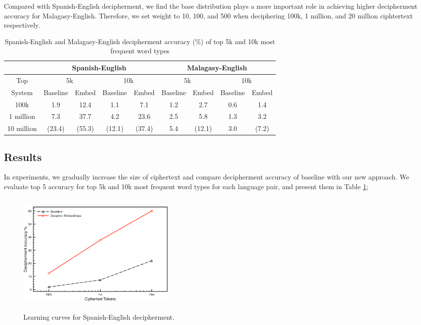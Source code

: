 Compared with Spanish-English decipherment, we find the base distribution plays a more important role in achieving higher decipherment accuracy for Malagasy-English. Therefore, we set weight to 10, 100, and 500 when deciphering 100k, 1 million, and 20 million ciphtertext respectively.


%
 \begin{table}[!ht]
 \begin{center}
 \begin{tabular}{ |c|c|c|c|c|c|c|c|c| } \hline
         & \multicolumn{4}{|c|}{Spanish-English} & \multicolumn{4}{|c|}{Malagasy-English} \\ \hline
 Top &  \multicolumn{2}{|c|}{5k} & \multicolumn{2}{|c|}{10k} & \multicolumn{2}{|c|}{5k} & \multicolumn{2}{|c|}{10k} \\ \hline
 System &  Baseline & Embed & Baseline & Embed &  Baseline & Embed & Baseline & Embed \\ \hline
 100k &  1.9 & 12.4 & 1.1 & 7.1 &  1.2 & 2.7 & 0.6 & 1.4 \\ \hline
 1 million &  7.3 & 37.7& 4.2 & 23.6 &  2.5 & 5.8 & 1.3 & 3.2 \\ \hline
 10 million &  (23.4) & (55.3) & (12.1) & (37.4) &  5.4 & (12.1) & 3.0 & (7.2) \\ \hline
 \end{tabular}
 \caption{Spanish-English and Malagasy-English decipherment accuracy (\%) of top 5k and 10k most frequent word types}
 \label{decipher-acc-result}
 \end{center}
 \end{table}
%

\subsection{Results}
In experiments, we gradually increase the size of ciphertext and compare decipherment accuracy of baseline with our new approach. We evaluate top 5 accuracy for top 5k and 10k most frequent word types for each language pair, and present them in Table \ref{decipher-acc-result}; 


 \begin{figure}[!ht]
  \centering
  \includegraphics[width=3.1in,height=2.4in]{es_en_curve}
  \caption{Learning curves for Spanish-English decipherment.}
\label{es-en-curve}
\end{figure}


